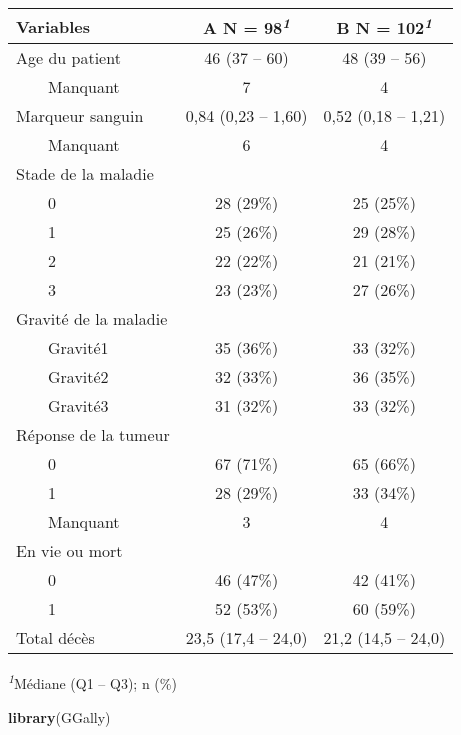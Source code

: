\documentclass[
]{article}
\newenvironment{Shaded}{\begin{snugshade}}{\end{snugshade}}
\newcommand{\FunctionTok}[1]{\textcolor[rgb]{0.13,0.29,0.53}{\textbf{#1}}}
\newcommand{\NormalTok}[1]{#1}
\begin{document}
\begin{table}[!t]
\fontsize{12.0pt}{14.4pt}\selectfont
\begin{tabular*}{\linewidth}{@{\extracolsep{\fill}}lcc}
\toprule
\textbf{Variables} & \textbf{A}  N = 98\textsuperscript{\textit{1}} & \textbf{B}  N = 102\textsuperscript{\textit{1}} \\ 
\midrule\addlinespace[2.5pt]
Age du patient & 46 (37 – 60) & 48 (39 – 56) \\ 
    Manquant & 7 & 4 \\ 
Marqueur sanguin & 0,84 (0,23 – 1,60) & 0,52 (0,18 – 1,21) \\ 
    Manquant & 6 & 4 \\ 
Stade de la maladie &  &  \\ 
    0 & 28 (29\%) & 25 (25\%) \\ 
    1 & 25 (26\%) & 29 (28\%) \\ 
    2 & 22 (22\%) & 21 (21\%) \\ 
    3 & 23 (23\%) & 27 (26\%) \\ 
Gravité de la maladie &  &  \\ 
    Gravité1 & 35 (36\%) & 33 (32\%) \\ 
    Gravité2 & 32 (33\%) & 36 (35\%) \\ 
    Gravité3 & 31 (32\%) & 33 (32\%) \\ 
Réponse de la tumeur &  &  \\ 
    0 & 67 (71\%) & 65 (66\%) \\ 
    1 & 28 (29\%) & 33 (34\%) \\ 
    Manquant & 3 & 4 \\ 
En vie ou mort &  &  \\ 
    0 & 46 (47\%) & 42 (41\%) \\ 
    1 & 52 (53\%) & 60 (59\%) \\ 
Total décès & 23,5 (17,4 – 24,0) & 21,2 (14,5 – 24,0) \\ 
\bottomrule
\end{tabular*}
\begin{minipage}{\linewidth}
\textsuperscript{\textit{1}}Médiane (Q1 -- Q3); n (\%)\\
\end{minipage}
\end{table}

\begin{Shaded}
\begin{Highlighting}[]
\FunctionTok{library}\NormalTok{(GGally)}
\end{Highlighting}
\end{Shaded}
\end{document}
